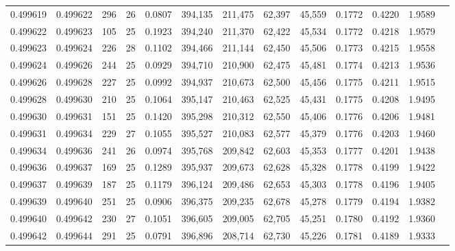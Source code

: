 \begin{tabular}{rrrrrrrrrrrrr}
0.499619 & 0.499622 & 296 &  26 &                                     0.0807 & 394,135 & 211,475 &  62,397 &  45,559 & 0.1772 & 0.4220 & 1.9589 \\
0.499622 & 0.499623 & 105 &  25 &                                     0.1923 & 394,240 & 211,370 &  62,422 &  45,534 & 0.1772 & 0.4218 & 1.9579 \\
0.499623 & 0.499624 & 226 &  28 &                                     0.1102 & 394,466 & 211,144 &  62,450 &  45,506 & 0.1773 & 0.4215 & 1.9558 \\
0.499624 & 0.499626 & 244 &  25 &                                     0.0929 & 394,710 & 210,900 &  62,475 &  45,481 & 0.1774 & 0.4213 & 1.9536 \\
0.499626 & 0.499628 & 227 &  25 &                                     0.0992 & 394,937 & 210,673 &  62,500 &  45,456 & 0.1775 & 0.4211 & 1.9515 \\
0.499628 & 0.499630 & 210 &  25 &                                     0.1064 & 395,147 & 210,463 &  62,525 &  45,431 & 0.1775 & 0.4208 & 1.9495 \\
0.499630 & 0.499631 & 151 &  25 &                                     0.1420 & 395,298 & 210,312 &  62,550 &  45,406 & 0.1776 & 0.4206 & 1.9481 \\
0.499631 & 0.499634 & 229 &  27 &                                     0.1055 & 395,527 & 210,083 &  62,577 &  45,379 & 0.1776 & 0.4203 & 1.9460 \\
0.499634 & 0.499636 & 241 &  26 &                                     0.0974 & 395,768 & 209,842 &  62,603 &  45,353 & 0.1777 & 0.4201 & 1.9438 \\
0.499636 & 0.499637 & 169 &  25 &                                     0.1289 & 395,937 & 209,673 &  62,628 &  45,328 & 0.1778 & 0.4199 & 1.9422 \\
0.499637 & 0.499639 & 187 &  25 &                                     0.1179 & 396,124 & 209,486 &  62,653 &  45,303 & 0.1778 & 0.4196 & 1.9405 \\
0.499639 & 0.499640 & 251 &  25 &                                     0.0906 & 396,375 & 209,235 &  62,678 &  45,278 & 0.1779 & 0.4194 & 1.9382 \\
0.499640 & 0.499642 & 230 &  27 &                                     0.1051 & 396,605 & 209,005 &  62,705 &  45,251 & 0.1780 & 0.4192 & 1.9360 \\
0.499642 & 0.499644 & 291 &  25 &                                     0.0791 & 396,896 & 208,714 &  62,730 &  45,226 & 0.1781 & 0.4189 & 1.9333 \\

\end{tabular}
